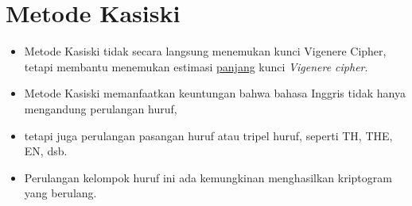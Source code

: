 \documentclass{article}
\begin{document}

\section*{Metode Kasiski}

\begin{itemize}
    \item Metode Kasiski tidak secara langsung menemukan kunci Vigenere Cipher, tetapi membantu menemukan estimasi \underline{panjang} kunci \textit{Vigenere cipher}.
    \item Metode Kasiski memanfaatkan keuntungan bahwa bahasa Inggris tidak hanya mengandung perulangan huruf,
    \item tetapi juga perulangan pasangan huruf atau tripel huruf, seperti TH, THE, EN, dsb.
    \item Perulangan kelompok huruf ini ada kemungkinan menghasilkan kriptogram yang berulang.
\end{itemize}
\end{document}
